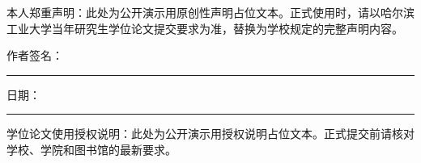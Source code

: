 本人郑重声明：此处为公开演示用原创性声明占位文本。正式使用时，请以哈尔滨工业大学当年研究生学位论文提交要求为准，替换为学校规定的完整声明内容。

\vspace{2cm}
\noindent 作者签名：\rule{5cm}{0.4pt}\hfill 日期：\rule{4cm}{0.4pt}

\vspace{2cm}
\noindent 学位论文使用授权说明：此处为公开演示用授权说明占位文本。正式提交前请核对学校、学院和图书馆的最新要求。
